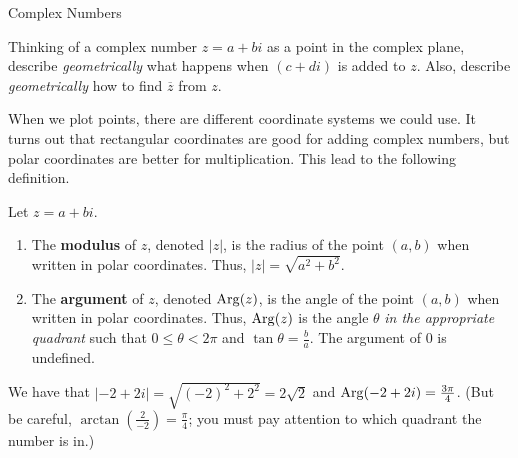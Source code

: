 \begin{section}{Complex Numbers}
\begin{problem}
Thinking of a complex number $z=a+bi$ as a point in the complex plane, describe \emph{geometrically} what happens when $(c+di)$ is added to $z$. Also, describe \emph{geometrically}  how to find $\overline{z}$ from $z$.
\end{problem}

When we plot points, there are different coordinate systems we could use. It turns out that  rectangular coordinates are good for adding complex numbers, but polar coordinates are better for multiplication. This lead to the following definition.

\begin{definition}
Let $z=a+bi$. 
\begin{enumerate}
\item The \textbf{modulus} of $z$, denoted $|z|$, is the radius of the point $(a,b)$ when written in polar coordinates. Thus, $|z| = \sqrt{a^2 + b^2}$. 
\item The \textbf{argument} of $z$, denoted $\operatorname{Arg}(z)$, is the angle of the point $(a,b)$ when written in polar coordinates. Thus, $\operatorname{Arg}(z)$ is the angle $\theta$ \emph{in the appropriate quadrant} such that $0\le \theta<2\pi$ and $\tan \theta = \frac{b}{a}$. The argument of  $0$ is undefined.
\end{enumerate}
\end{definition}

\begin{example}
We have that $|-2 + 2i| = \sqrt{(-2)^2+2^2} = 2\sqrt{2}$ and $\operatorname{Arg}(-2 + 2i) = \frac{3\pi}{4}$. (But be careful, $\arctan\left(\frac{2}{-2}\right) = \frac{\pi}{4}$; you must pay attention to which quadrant the number is in.)
\begin{center}
\end{center}
\end{example}
\end{section}
